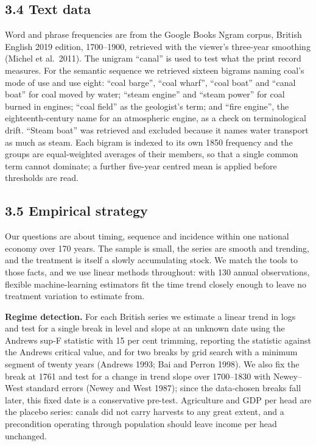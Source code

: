\documentclass[
  11pt,
]{article}
\begin{document}
\subsection{3.4 Text data}\label{text-data}

Word and phrase frequencies are from the Google Books Ngram corpus,
British English 2019 edition, 1700--1900, retrieved with the viewer's
three-year smoothing (Michel et al.~2011). The unigram ``canal'' is used
to test what the print record measures. For the semantic sequence we
retrieved sixteen bigrams naming coal's mode of use and use eight:
``coal barge'', ``coal wharf'', ``coal boat'' and ``canal boat'' for
coal moved by water; ``steam engine'' and ``steam power'' for coal
burned in engines; ``coal field'' as the geologist's term; and ``fire
engine'', the eighteenth-century name for an atmospheric engine, as a
check on terminological drift. ``Steam boat'' was retrieved and excluded
because it names water transport as much as steam. Each bigram is
indexed to its own 1850 frequency and the groups are equal-weighted
averages of their members, so that a single common term cannot dominate;
a further five-year centred mean is applied before thresholds are read.

\subsection{3.5 Empirical strategy}\label{empirical-strategy}

Our questions are about timing, sequence and incidence within one
national economy over 170 years. The sample is small, the series are
smooth and trending, and the treatment is itself a slowly accumulating
stock. We match the tools to those facts, and we use linear methods
throughout: with 130 annual observations, flexible machine-learning
estimators fit the time trend closely enough to leave no treatment
variation to estimate from.

\textbf{Regime detection.} For each British series we estimate a linear
trend in logs and test for a single break in level and slope at an
unknown date using the Andrews sup-F statistic with 15 per cent
trimming, reporting the statistic against the Andrews critical value,
and for two breaks by grid search with a minimum segment of twenty years
(Andrews 1993; Bai and Perron 1998). We also fix the break at 1761 and
test for a change in trend slope over 1700--1830 with Newey--West
standard errors (Newey and West 1987); since the data-chosen breaks fall
later, this fixed date is a conservative pre-test. Agriculture and GDP
per head are the placebo series: canals did not carry harvests to any
great extent, and a precondition operating through population should
leave income per head unchanged.
\end{document}
